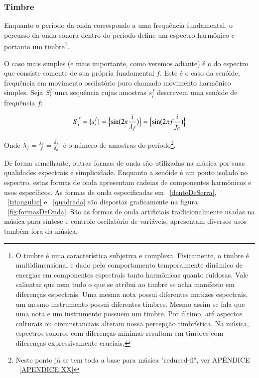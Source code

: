 \subsubsection{Timbre}
Enquanto o período da onda corresponde a uma frequência fundamental, o percurso
da onda sonora dentro do período define um espectro harmônico e portanto
um timbre\footnote{O timbre é uma característica subjetiva e complexa. Fisicamente,
o timbre é multidimensional e dado pelo comportamento temporalmente dinâmico
de energias em componentes espectrais tanto harmônicas quanto ruidosas.  Vale salientar que nem tudo
o que se atribui ao timbre se acha manifesto em diferenças espectrais. Uma mesma nota
possui diferentes matizes espectrais, um mesmo instrumento possui diferentes timbres. Mesmo
assim se fala que uma nota e um instrumento possuem um timbre. Por último, até
aspectos culturais ou circunstanciais alteram nossa percepção timbrística.
Na música, espectros
sonoros com diferenças mínimas resultam em
 timbres com diferenças expressivamente cruciais.
}.

O caso mais simples (e mais importante, como veremos adiante) é o do espectro que consiste somente
de sua própria fundamental $f$. Este é o caso da senóide, frequência em movimento oscilatório puro chamado
movimento harmônico simples. Seja $S_i^f$ uma sequência cujas amostras
$s_i^f$ descrevem uma senóide de frequência $f$:

\begin{equation}\label{senoide}
     S^f_i=\{ s^f_i \}=\Bigl\{ \sin\bigl(2\pi \frac{i}{\lambda_f} \bigr)  \Bigr\} = \Bigl\{ \sin\bigl(2\pi f \frac{i}{f_a}\bigr)  \Bigr\} 
\end{equation}

Onde $\lambda_f=\frac{f_a}{f}=\frac{\delta_f}{\delta_a} \;$ é o número de amostras do período\footnote{Neste ponto já se tem toda a base para música "reduced-fi", ver APÊNDICE ~\ref{APENDICE XX}}.

De forma semelhante, outras formas de onda são utilizadas na música por suas qualidades
espectrais e simplicidade. Enquanto a senóide é um ponto isolado no espectro, estas formas
de onda apresentam cadeias de componentes harmônicos e usos específicos.
As formas de onda especificadas em ~\ref{denteDeSerra}, ~\ref{triangular} e ~\ref{quadrada} são dispostas graficamente na figura ~\ref{fig:formasDeOnda}. 
São as formas de onda artificiais tradicionalmente usadas na música para síntese e controle oscilatório de variáveis, apresentam diversos usos também fora da música.

